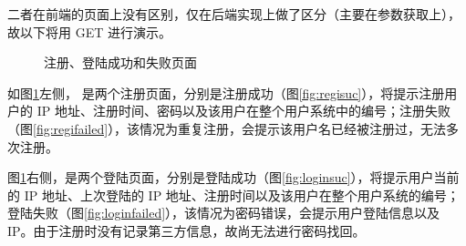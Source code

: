 二者在前端的页面上没有区别，仅在后端实现上做了区分（主要在参数获取上），故以下将用 GET 进行演示。

\begin{figure}[htbp!]
    \centering
    \caption{注册、登陆成功和失败页面}\label{fig:2regi}
\end{figure}

如图\ref{fig:2regi}左侧， 是两个注册页面，分别是注册成功（图\ref{fig:regisuc}），将提示注册用户的 IP 地址、注册时间、密码以及该用户在整个用户系统中的编号；注册失败（图\ref{fig:regifailed}），该情况为重复注册，会提示该用户名已经被注册过，无法多次注册。

图\ref{fig:2regi}右侧，是两个登陆页面，分别是登陆成功（图\ref{fig:loginsuc}），将提示用户当前的 IP 地址、上次登陆的 IP 地址、注册时间以及该用户在整个用户系统的编号；登陆失败（图\ref{fig:loginfailed}），该情况为密码错误，会提示用户登陆信息以及 IP。由于注册时没有记录第三方信息，故尚无法进行密码找回。


